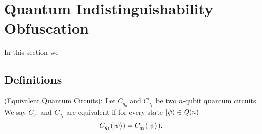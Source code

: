 
\section{Quantum Indistinguishability Obfuscation}
\label{sec:QiO-Cliffords and more}
 In this section we 

\subsection{Definitions}
\label{sec:iO-Cliffords and more}
\begin{definition} {\rm (Equivalent Quantum Circuits):}
\label{def:eqcircuit}
Let $C_{q_0}$ and $C_{q_1}$ be two $n$-qubit quantum circuits. We say $C_{q_0}$ and $C_{q_1}$ are equivalent if for every state ${\lvert}\psi\rangle\in\mathit{Q}(n)$
$$C_{q_1}({\lvert}\psi\rangle) =C_{q_2}({\lvert}\psi\rangle).$$
\end{definition}

